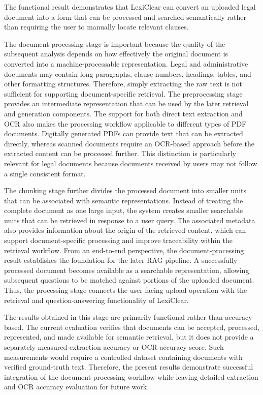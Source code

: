 \documentclass[12pt,a4paper,oneside]{report}
\begin{document}
The functional result demonstrates that LexiClear can convert an uploaded legal document into a form that can be processed and searched semantically rather than requiring the user to manually locate relevant clauses.

The document-processing stage is important because the quality of the subsequent analysis depends on how effectively the original document is converted into a machine-processable representation. Legal and administrative documents may contain long paragraphs, clause numbers, headings, tables, and other formatting structures. Therefore, simply extracting the raw text is not sufficient for supporting document-specific retrieval. The preprocessing stage provides an intermediate representation that can be used by the later retrieval and generation components. The support for both direct text extraction and OCR also makes the processing workflow applicable to different types of PDF documents. Digitally generated PDFs can provide text that can be extracted directly, whereas scanned documents require an OCR-based approach before the extracted content can be processed further. This distinction is particularly relevant for legal documents because documents received by users may not follow a single consistent format.

The chunking stage further divides the processed document into smaller units that can be associated with semantic representations. Instead of treating the complete document as one large input, the system creates smaller searchable units that can be retrieved in response to a user query. The associated metadata also provides information about the origin of the retrieved content, which can support document-specific processing and improve traceability within the retrieval workflow. From an end-to-end perspective, the document-processing result establishes the foundation for the later RAG pipeline. A successfully processed document becomes available as a searchable representation, allowing subsequent questions to be matched against portions of the uploaded document. Thus, the processing stage connects the user-facing upload operation with the retrieval and question-answering functionality of LexiClear.

The results obtained in this stage are primarily functional rather than accuracy-based. The current evaluation verifies that documents can be accepted, processed, represented, and made available for semantic retrieval, but it does not provide a separately measured extraction accuracy or OCR accuracy score. Such measurements would require a controlled dataset containing documents with verified ground-truth text. Therefore, the present results demonstrate successful integration of the document-processing workflow while leaving detailed extraction and OCR accuracy evaluation for future work.
\end{document}
